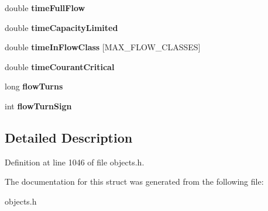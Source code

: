 \begin{DoxyCompactItemize}
double {\bfseries time\+Full\+Flow}
\item 
\mbox{\label{struct_t_link_stats_ab5b91e3e0c54498e8b6002a8ba5535ac}} 
double {\bfseries time\+Capacity\+Limited}
\item 
\mbox{\label{struct_t_link_stats_adce047a7f24948c727e7b97db8d46569}} 
double {\bfseries time\+In\+Flow\+Class} \mbox{[}M\+A\+X\+\_\+\+F\+L\+O\+W\+\_\+\+C\+L\+A\+S\+S\+ES\mbox{]}
\item 
\mbox{\label{struct_t_link_stats_af60e38350648791e54291df996712fc0}} 
double {\bfseries time\+Courant\+Critical}
\item 
\mbox{\label{struct_t_link_stats_a8cade640565379917aa3434933382d3d}} 
long {\bfseries flow\+Turns}
\item 
\mbox{\label{struct_t_link_stats_a052d149180e0810c065a99fee6bbfac6}} 
int {\bfseries flow\+Turn\+Sign}
\end{DoxyCompactItemize}


\subsection{Detailed Description}


Definition at line 1046 of file objects.\+h.



The documentation for this struct was generated from the following file\+:\begin{DoxyCompactItemize}
\item 
objects.\+h\end{DoxyCompactItemize}
